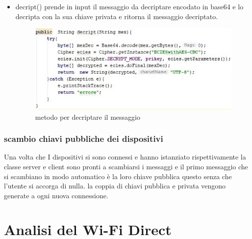 \begin{itemize}
\begin{figure}
   \end{figure}
   \item decript() prende in input il messaggio da decriptare encodato in base64
   e lo decripta con
   la sua chiave privata e ritorna il messaggio decriptato.
   \begin{figure}
       \caption{metodo per decriptare il messaggio}
       \includegraphics[width=1  \columnwidth]{imgs/decript.jpg}
   \end{figure}
\end{itemize}

\subsubsection{scambio chiavi pubbliche dei dispositivi}

Una volta che I dispositivi si sono connessi e hanno istanziato
rispettivamente la classe server e client sono pronti a scambiarsi i messaggi
e il primo messaggio che si scambiano in modo automatico è la loro chiave pubblica
questo senza che l'utente si accorga di nulla.
la coppia di chiavi pubblica e privata vengono generate a ogni nuova connessione.

\section{Analisi del Wi-Fi Direct}

